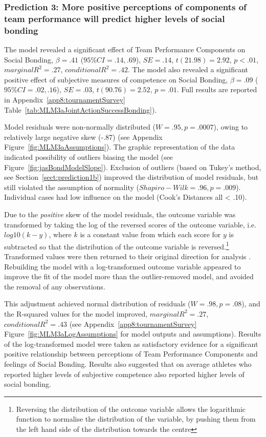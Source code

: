 \begin{CJK}{UTF8}{gbsn}
\subsubsection{Prediction 3: More positive perceptions of components of team performance will predict higher levels of social bonding}


The model revealed a significant effect of Team Performance Components on Social Bonding, $\beta = .41$ ($95\% CI =  .14, .69$), $SE = .14$, $t(21.98) = 2.92$, $p < .01$, $marginal R^2 = .27$, $conditional R^2 = .42$.  The model also revealed a significant positive effect of subjective measures of competence on Social Bonding, $\beta = .09$ ($95\% CI =  .02, .16$), $SE = .03$, $t(90.76) = 2.52$, $p = .01$. Full results are reported in Appendix~\ref{app8:tournamentSurvey} Table~\ref{tab:MLM3aJointActionSuccessBonding}).

Model residuals were non-normally distributed ($W = .95, p = .0007$), owing to relatively large negative skew (-.87) (see Appendix Figure~\ref{fig:MLM3aAssumptions}).  The graphic representation of the data indicated possibility of outliers biasing the model (see Figure~\ref{fig:jasBondModelSlope}).
Exclusion of outliers (based on Tukey's method, see Section~\ref{sect:prediction1b}) improved the distribution of model residuals, but still violated the assumption of normality ($Shapiro-Wilk = .96, p = .009$).  Individual cases had low influence on the model (Cook's Distances all < .10).

Due to the \textit{positive} skew of the model residuals, the outcome variable was transformed by taking the log of the reversed scores of the outcome variable, i.e. $log10(k - y)$, where $k$ is a constant value from which each score for $y$ is subtracted so that the distribution of the outcome variable is reversed\citep{Howell2012}.\footnote{Reversing the distribution of the outcome variable allows the logarithmic function to normalise the distribution of the variable, by pushing them from the left hand side of the distribution towards the centre}
Transformed values were then returned to their original direction for analysis \citep{Field2012}.  Rebuilding the model with a log-transformed outcome variable appeared to improve the fit of the model more than the outlier-removed model, and avoided the removal of any observations.

This adjustment achieved normal distribution of residuals ($W = .98, p = .08$), and the R-squared values for the model improved, $marginal R^2 = .27$, $conditional R^2 = .43$ (see Appendix~\ref{app8:tournamentSurvey} Figure~\ref{fig:MLM3aLogAssumptions} for model outputs and assumptions).  Results of the log-transformed model were taken as satisfactory evidence for a significant positive relationship between perceptions of Team Performance Components and feelings of Social Bonding.  Results also suggested that on average athletes who reported higher levels of subjective competence also reported higher levels of social bonding.



\end{CJK}
